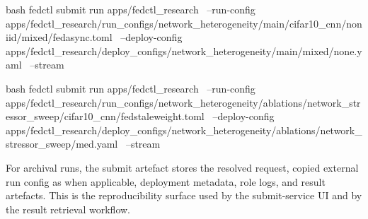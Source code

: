 \begin{codeblock}[minted options app={breaklines,breakanywhere,fontsize=\footnotesize}]{bash}
fedctl submit run apps/fedctl_research \
  --run-config apps/fedctl_research/run_configs/network_heterogeneity/main/cifar10_cnn/noniid/mixed/fedasync.toml \
  --deploy-config apps/fedctl_research/deploy_configs/network_heterogeneity/main/mixed/none.yaml \
  --stream
\end{codeblock}

\begin{codeblock}[minted options app={breaklines,breakanywhere,fontsize=\footnotesize}]{bash}
fedctl submit run apps/fedctl_research \
  --run-config apps/fedctl_research/run_configs/network_heterogeneity/ablations/network_stressor_sweep/cifar10_cnn/fedstaleweight.toml \
  --deploy-config apps/fedctl_research/deploy_configs/network_heterogeneity/ablations/network_stressor_sweep/med.yaml \
  --stream
\end{codeblock}

For archival runs, the submit artefact stores the resolved request, copied external run config as  when applicable, deployment metadata, role logs, and result artefacts. This is the reproducibility surface used by the submit-service UI and by the result retrieval workflow.
